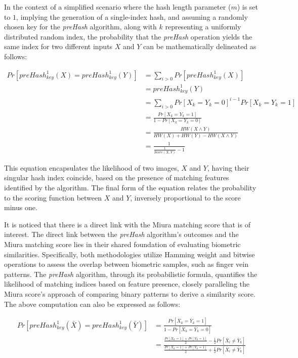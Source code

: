 In the context of a simplified scenario where the hash length parameter (\(m\)) is set to \(1\), implying the generation of a single-index hash, and assuming a randomly chosen key for the \textit{preHash} algorithm, along with \(k\) representing a uniformly distributed random index, the probability that the \textit{preHash} operation yields the same index for two different inputs \(X\) and \(Y\) can be mathematically delineated as follows:

\begin{equation} \label{eq:preHash1}
    \begin{aligned}
        Pr[preHash_{key}^1(X) = preHash_{key}^1(Y)] &= \sum_{i > 0} Pr[preHash_{key}^1(X)]\\
        &= preHash_{key}^1(Y)\\
        &= \sum_{i > 0} Pr[X_k = Y_k = 0]^{i - 1} Pr[X_k = Y_k = 1]\\
        &= \frac{Pr[X_k = Y_k = 1]}{1 - Pr[X_k = Y_k = 0]}\\
        &= \frac{HW(X \land Y)}{HW(X) + HW(Y) - HW(X \land Y)}\\
        &= \frac{1}{\frac{1}{Score(X, Y)} - 1}
    \end{aligned}
\end{equation}

This equation encapsulates the likelihood of two images, \(X\) and \(Y\), having their singular hash index coincide, based on the presence of matching features identified by the algorithm. The final form of the equation relates the probability to the scoring function between \(X\) and \(Y\), inversely proportional to the score minus one.

It is noticed that there is a direct link with the Miura matching score that is of interest. The direct link between the \textit{preHash} algorithm's outcomes and the Miura matching score lies in their shared foundation of evaluating biometric similarities. Specifically, both methodologies utilize Hamming weight and bitwise operations to assess the overlap between biometric samples, such as finger vein patterns. The \textit{preHash} algorithm, through its probabilistic formula, quantifies the likelihood of matching indices based on feature presence, closely paralleling the Miura score's approach of comparing binary patterns to derive a similarity score. The above computation can also be expressed as follows:

\begin{equation} \label{eq:preHash2}
    \begin{aligned}
        Pr[preHash_{key}^1(\bar{X}) = preHash_{key}^1(\bar{Y})] &= \frac{Pr[\bar{X}_k = \bar{Y}_k = 1]}{1 - Pr[\bar{X}_k = \bar{Y}_k = 0]}\\
        &= \frac{\frac{Pr[X_k = 1] + Pr[Y_k = 1]}{2} - \frac{1}{2}Pr[\bar{X}_l \neq \bar{Y}_k]}{\frac{Pr[X_k = 1] + Pr[Y_k = 1]}{2} + \frac{1}{2}Pr[\bar{X}_l \neq \bar{Y}_k]}\\
    \end{aligned}
\end{equation}

